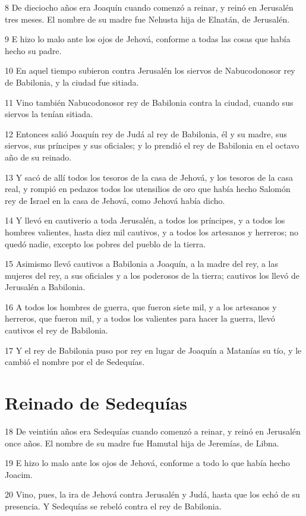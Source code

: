 \par 8 De dieciocho años era Joaquín cuando comenzó a reinar, y reinó en Jerusalén tres meses. El nombre de su madre fue Nehusta hija de Elnatán, de Jerusalén.
\par 9 E hizo lo malo ante los ojos de Jehová, conforme a todas las cosas que había hecho su padre.
\par 10 En aquel tiempo subieron contra Jerusalén los siervos de Nabucodonosor rey de Babilonia, y la ciudad fue sitiada.
\par 11 Vino también Nabucodonosor rey de Babilonia contra la ciudad, cuando sus siervos la tenían sitiada.
\par 12 Entonces salió Joaquín rey de Judá al rey de Babilonia, él y su madre, sus siervos, sus príncipes y sus oficiales; y lo prendió el rey de Babilonia en el octavo año de su reinado. 
\par 13 Y sacó de allí todos los tesoros de la casa de Jehová, y los tesoros de la casa real, y rompió en pedazos todos los utensilios de oro que había hecho Salomón rey de Israel en la casa de Jehová, como Jehová había dicho.
\par 14 Y llevó en cautiverio a toda Jerusalén, a todos los príncipes, y a todos los hombres valientes, hasta diez mil cautivos, y a todos los artesanos y herreros; no quedó nadie, excepto los pobres del pueblo de la tierra.
\par 15 Asimismo llevó cautivos a Babilonia a Joaquín, a la madre del rey, a las mujeres del rey, a sus oficiales y a los poderosos de la tierra; cautivos los llevó de Jerusalén a Babilonia. 
\par 16 A todos los hombres de guerra, que fueron siete mil, y a los artesanos y herreros, que fueron mil, y a todos los valientes para hacer la guerra, llevó cautivos el rey de Babilonia.
\par 17 Y el rey de Babilonia puso por rey en lugar de Joaquín a Matanías su tío, y le cambió el nombre por el de Sedequías. 

\section*{Reinado de Sedequías}

\par 18 De veintiún años era Sedequías cuando comenzó a reinar, y reinó en Jerusalén once años. El nombre de su madre fue Hamutal hija de Jeremías, de Libna.
\par 19 E hizo lo malo ante los ojos de Jehová, conforme a todo lo que había hecho Joacim.
\par 20 Vino, pues, la ira de Jehová contra Jerusalén y Judá, hasta que los echó de su presencia. Y Sedequías se rebeló contra el rey de Babilonia. 

